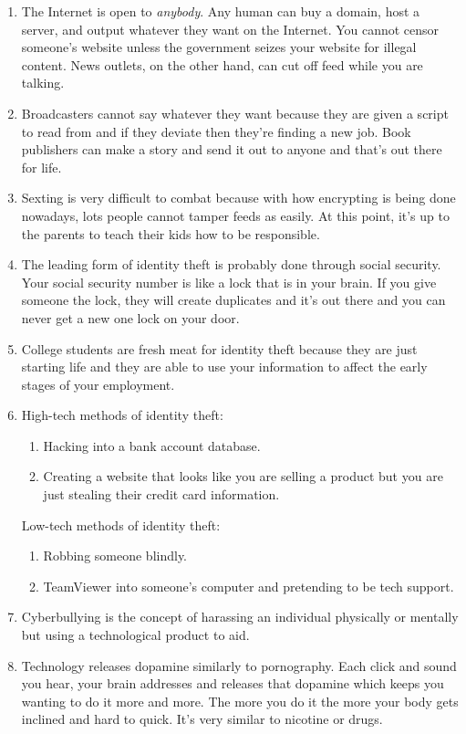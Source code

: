 \documentclass[12pt]{article}
\begin{document}
\begin{enumerate}
        \item The Internet is open to \emph{anybody}. Any human can buy a domain, host a server, and output whatever they want on the Internet. You cannot censor someone's website unless the government seizes your website for illegal content. News outlets, on the other hand, can cut off feed while you are talking.
        \item Broadcasters cannot say whatever they want because they are given a script to read from and if they deviate then they're finding a new job. Book publishers can make a story and send it out to anyone and that's out there for life.
        \item Sexting is very difficult to combat because with how encrypting is being done nowadays, lots people cannot tamper feeds as easily. At this point, it's up to the parents to teach their kids how to be responsible.
        \item The leading form of identity theft is probably done through social security. Your social security number is like a lock that is in your brain. If you give someone the lock, they will create duplicates and it's out there and you can never get a new one lock on your door.
        \item College students are fresh meat for identity theft because they are just starting life and they are able to use your information to affect the early stages of your employment.
        \item High-tech methods of identity theft:
            \begin{enumerate}
                \item Hacking into a bank account database.
                \item Creating a website that looks like you are selling a product but you are just stealing their credit card information.
            \end{enumerate}
            Low-tech methods of identity theft:
            \begin{enumerate}
                \item Robbing someone blindly.
                \item TeamViewer into someone's computer and pretending to be tech support.
            \end{enumerate}
        \item Cyberbullying is the concept of harassing an individual physically or mentally but using a technological product to aid.
        \item Technology releases dopamine similarly to pornography. Each click and sound you hear, your brain addresses and releases that dopamine which keeps you wanting to do it more and more. The more you do it the more your body gets inclined and hard to quick. It's very similar to nicotine or drugs.
     \end{enumerate}
        
\end{document}
